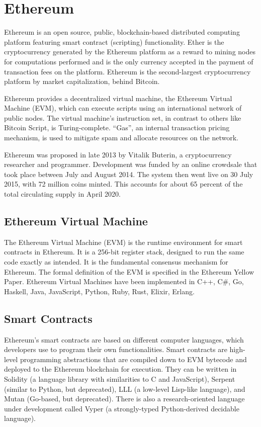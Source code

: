 \section{Ethereum}

Ethereum is an open source, public, blockchain-based distributed computing
platform featuring smart contract (scripting) functionality. Ether is the
cryptocurrency generated by the Ethereum platform as a reward to mining nodes
for computations performed and is the only currency accepted in the payment of
transaction fees on the platform. Ethereum is the second-largest
cryptocurrency platform by market capitalization, behind Bitcoin.

Ethereum provides a decentralized virtual machine, the Ethereum Virtual Machine
(EVM), which can execute scripts using an international network of public
nodes. The virtual machine's instruction set, in contrast to others like
Bitcoin Script, is Turing-complete. ``Gas'', an internal transaction pricing
mechanism, is used to mitigate spam and allocate resources on the network.

Ethereum was proposed in late 2013 by Vitalik Buterin, a cryptocurrency
researcher and programmer. Development was funded by an online crowdsale that
took place between July and August 2014. The system then went live on 30
July 2015, with 72 million coins minted. This accounts for about 65
percent of the total circulating supply in April 2020.

\subsection{Ethereum Virtual Machine}

The Ethereum Virtual Machine (EVM) is the runtime environment for smart
contracts in Ethereum. It is a 256-bit register stack, designed to run the same
code exactly as intended. It is the fundamental consensus mechanism for
Ethereum. The formal definition of the EVM is specified in the Ethereum Yellow
Paper. Ethereum Virtual Machines have been implemented in C++, C\#, Go,
Haskell, Java, JavaScript, Python, Ruby, Rust, Elixir, Erlang.

\subsection{Smart Contracts}

Ethereum's smart contracts are based on different computer languages, which
developers use to program their own functionalities. Smart contracts are
high-level programming abstractions that are compiled down to EVM bytecode and
deployed to the Ethereum blockchain for execution. They can be written in
Solidity (a language library with similarities to C and JavaScript), Serpent
(similar to Python, but deprecated), LLL (a low-level Lisp-like language), and
Mutan (Go-based, but deprecated). There is also a research-oriented language
under development called Vyper (a strongly-typed Python-derived decidable
language).

